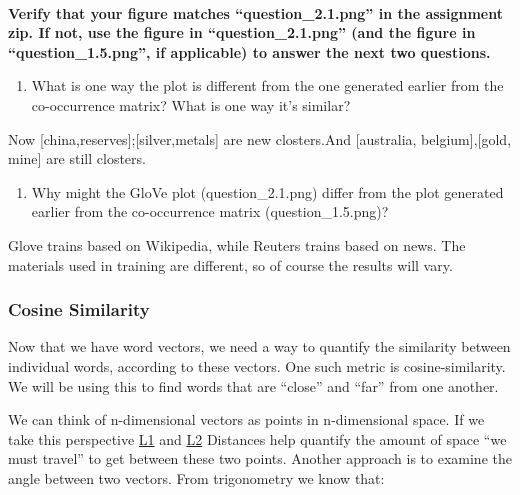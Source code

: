 \documentclass[11pt]{article}
\providecommand{\tightlist}{%
      \setlength{\itemsep}{0pt}\setlength{\parskip}{0pt}}
\begin{document}
    \begin{center}
    \end{center}
    { \hspace*{\fill} \\}
    
    \textbf{Verify that your figure matches ``question\_2.1.png'' in the
assignment zip. If not, use the figure in ``question\_2.1.png'' (and the
figure in ``question\_1.5.png'', if applicable) to answer the next two
questions.}

    \begin{enumerate}
\def\labelenumi{\alph{enumi}.}
\tightlist
\item
  What is one way the plot is different from the one generated earlier
  from the co-occurrence matrix? What is one way it's similar?
\end{enumerate}

    Now {[}china,reserves{]};{[}silver,metals{]} are new closters.And
{[}australia, belgium{]},{[}gold, mine{]} are still closters.

    \begin{enumerate}
\def\labelenumi{\alph{enumi}.}
\setcounter{enumi}{1}
\tightlist
\item
  Why might the GloVe plot (question\_2.1.png) differ from the plot
  generated earlier from the co-occurrence matrix (question\_1.5.png)?
\end{enumerate}

    Glove trains based on Wikipedia, while Reuters trains based on news. The
materials used in training are different, so of course the results will
vary.

    \subsubsection{Cosine Similarity}\label{cosine-similarity}

Now that we have word vectors, we need a way to quantify the similarity
between individual words, according to these vectors. One such metric is
cosine-similarity. We will be using this to find words that are
``close'' and ``far'' from one another.

We can think of n-dimensional vectors as points in n-dimensional space.
If we take this perspective
\href{http://mathworld.wolfram.com/L1-Norm.html}{L1} and
\href{http://mathworld.wolfram.com/L2-Norm.html}{L2} Distances help
quantify the amount of space ``we must travel'' to get between these two
points. Another approach is to examine the angle between two vectors.
From trigonometry we know that:
\end{document}
